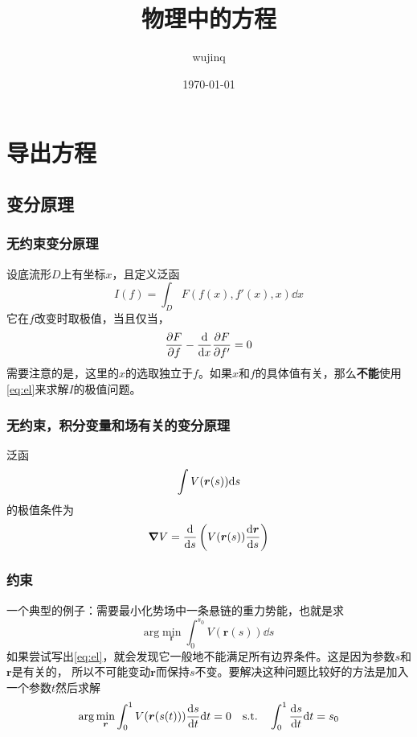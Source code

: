 \documentclass[UTF8, a4paper]{ctexart}
\title{物理中的方程}
\author{wujinq}
\date{\today}
\newcommand*{\argmin}{\mathrm{arg}\min}
\newcommand*{\st}{\quad \text{s.t.} \quad}
\begin{document}
\maketitle
    
\section{导出方程}

\subsection{变分原理}

\subsubsection{无约束变分原理}
设底流形$D$上有坐标$x$，且定义泛函
\begin{equation}
    I(f) = \int_D F(f(x), f'(x), x) \dd x
\end{equation}
它在$f$改变时取极值，当且仅当，
\begin{equation}
    \pdv{F}{f} - \dv{x} \pdv{F}{f'} = 0
    \label{eq:el}
\end{equation}
需要注意的是，这里的$x$的选取独立于$f$。如果$x$和$f$的具体值有关，那么\textbf{不能}使用\eqref{eq:el}来求解$I$的极值问题。

\subsubsection{无约束，积分变量和场有关的变分原理}

泛函
\begin{equation}
    \int V(\vb*{r}(s)) \dd s
\end{equation}
的极值条件为
\begin{equation}
    \grad V = \dv{s} \left( V(\vb*{r}(s)) \dv{\vb*{r}}{s} \right)
\end{equation}

\subsubsection{约束}
一个典型的例子：需要最小化势场中一条悬链的重力势能，也就是求
\[
    \argmin_{\boldsymbol{r}} \int_0^{s_0} V(\boldsymbol{r}(s)) \dd s
\]
如果尝试写出\eqref{eq:el}，就会发现它一般地不能满足所有边界条件。这是因为参数$s$和$\boldsymbol{r}$是有关的，
所以不可能变动$\boldsymbol{r}$而保持$s$不变。要解决这种问题比较好的方法是加入一个参数$t$然后求解
\[
    \argmin_{\boldsymbol{r}} \int_0^1 V(\boldsymbol{r}(s(t))) \dv{s}{t} \dd t = 0 \st \int_0^1 \dv{s}{t} \dd t = s_0
\]
\end{document}
